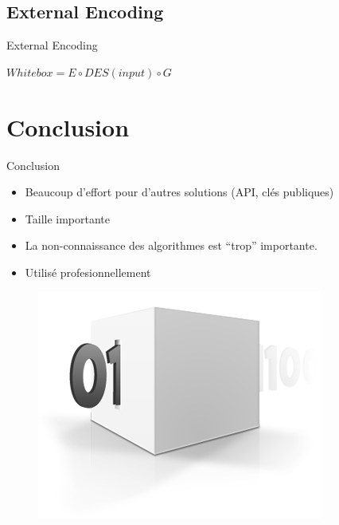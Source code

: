 \documentclass{beamer}
\begin{document}
\subsection{External Encoding}

\begin{frame}{External Encoding}
\begin{center}
  $Whitebox = E \circ DES(input) \circ G$
\end{center}
\end{frame}

\section{Conclusion}

\begin{frame}{Conclusion}
  
  \begin{itemize}
  \item Beaucoup d'effort pour d'autres solutions (API, clés publiques)
  \item Taille importante
  \item La non-connaissance des algorithmes est ``trop'' importante.
  \item Utilisé profesionnellement
  \end{itemize}

\begin{figure}[h]
  \centering
  \includegraphics[scale=0.6]{./images/conclusion.png}
\end{figure}

\end{frame}
\end{document}
